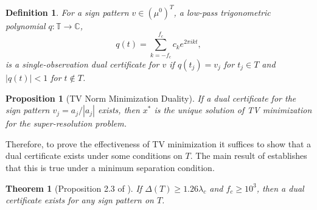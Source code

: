 \documentclass[11pt]{article}
\newcommand{\TT}{\mathbb{T}}
\newcommand{\CC}{\mathbb{C}}
\newtheorem{theorem}{Theorem}
\newtheorem{definition}{Definition}
\newtheorem{proposition}{Proposition}
\begin{document}
\begin{definition}
    For a sign pattern $v \in (\mu^0)^T$, a low-pass trigonometric polynomial $q: \TT \to \CC$,
    \begin{equation}
        q(t) = \sum_{k = -f_c}^{f_c} c_k e^{2\pi i k t},
    \end{equation}
    is a \emph{single-observation dual certificate} for $v$ if $q(t_j) = v_j$ for $t_j \in T$ and $|q(t)| < 1$ for $t \notin T$.
\end{definition}
\begin{proposition}[TV Norm Minimization Duality]
If a dual certificate for the sign pattern $v_j = a_j / |a_j|$ exists, then $x^*$ is the unique solution of TV minimization for the super-resolution problem.
\end{proposition}
Therefore, to prove the effectiveness of TV minimization it suffices to show that a dual certificate exists under some conditions on $T$.
The main result of \cite{fernandez2016super} establishes that this is true under a minimum separation condition.
\begin{theorem}[Proposition 2.3 of \cite{fernandez2016super}]
    If $\Delta(T) \geq 1.26\lambda_c$ and $f_c \geq 10^3$, then a dual certificate exists for any sign pattern on $T$.
    \label{thm:single-obs-recovery}
\end{theorem}
\end{document}

